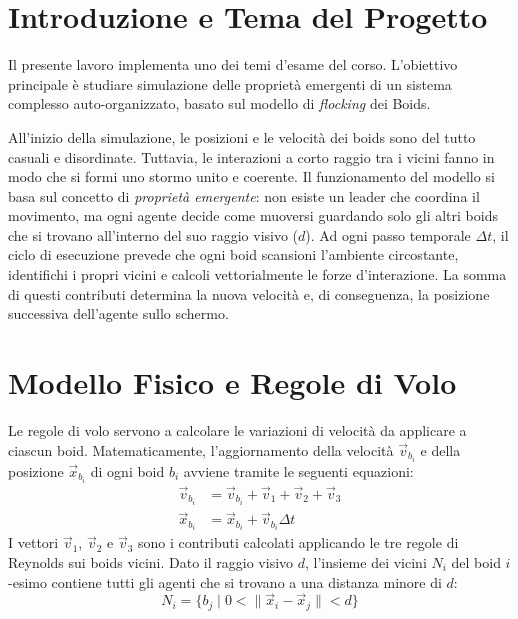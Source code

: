 \documentclass[11pt, a4paper]{article}
\begin{document}
\section{Introduzione e Tema del Progetto}
\label{sec:introduzione}
Il presente lavoro implementa uno dei temi d'esame del corso. L'obiettivo principale è studiare simulazione delle proprietà emergenti di un sistema complesso auto-organizzato, basato sul modello di \textit{flocking} dei Boids.

All'inizio della simulazione, le posizioni e le velocità dei boids sono del tutto casuali e disordinate. Tuttavia, le interazioni a corto raggio tra i vicini fanno in modo che si formi uno stormo unito e coerente. Il funzionamento del modello si basa sul concetto di \textit{proprietà emergente}: non esiste un leader che coordina il movimento, ma ogni agente decide come muoversi guardando solo gli altri boids che si trovano all'interno del suo raggio visivo ($d$). Ad ogni passo temporale $\Delta t$, il ciclo di esecuzione prevede che ogni boid scansioni l'ambiente circostante, identifichi i propri vicini e calcoli vettorialmente le forze d'interazione. La somma di questi contributi determina la nuova velocità e, di conseguenza, la posizione successiva dell'agente sullo schermo.

\section{Modello Fisico e Regole di Volo}
\label{sec:modellofisico}
Le regole di volo servono a calcolare le variazioni di velocità da applicare a ciascun boid. Matematicamente, l'aggiornamento della velocità $\vec{v}_{b_i}$ e della posizione $\vec{x}_{b_i}$ di ogni boid $b_i$ avviene tramite le seguenti equazioni:
\begin{align}
    \vec{v}_{b_i} &= \vec{v}_{b_i} + \vec{v}_1 + \vec{v}_2 + \vec{v}_3 \\
    \vec{x}_{b_i} &= \vec{x}_{b_i} + \vec{v}_{b_i} \Delta t
\end{align}
I vettori $\vec{v}_1$, $\vec{v}_2$ e $\vec{v}_3$ sono i contributi calcolati applicando le tre regole di Reynolds sui boids vicini. Dato il raggio visivo $d$, l'insieme dei vicini $N_i$ del boid $i$-esimo contiene tutti gli agenti che si trovano a una distanza minore di $d$:
\begin{equation}
    N_i = \{ b_j \;\vert\; 0 < \lVert \vec{x}_i - \vec{x}_j \rVert < d \}
\end{equation}
\end{document}
